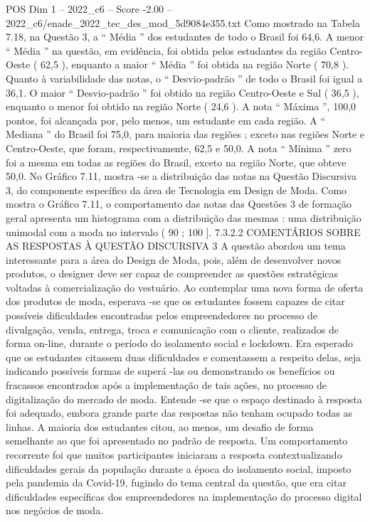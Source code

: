 \begin{textsample}{POS Dim 1 – 2022\_c6 – Score -2.00 – 2022\_c6/enade\_2022\_tec\_des\_mod\_5d9084e355.txt}
Como mostrado na Tabela 7.18, na Questão 3, a “ Média ” dos estudantes de todo o Brasil foi 64,6.
A menor “ Média ” na questão, em evidência, foi obtida pelos estudantes da região Centro-Oeste ( 62,5 ), enquanto a maior “ Média ” foi obtida na região Norte ( 70,8 ).
Quanto à variabilidade das notas, o “ Desvio-padrão ” de todo o Brasil foi igual a 36,1.
O maior “ Desvio-padrão ” foi obtido na região Centro-Oeste e Sul ( 36,5 ), enquanto o menor foi obtido na região Norte ( 24,6 ).
A nota “ Máxima ”, 100,0 pontos, foi alcançada por, pelo menos, um estudante em cada região.
A “ Mediana ” do Brasil foi 75,0, para maioria das regiões ; exceto nas regiões Norte e Centro-Oeste, que foram, respectivamente, 62,5 e 50,0.
A nota “ Mínima ” zero foi a mesma em todas as regiões do Brasil, exceto na região Norte, que obteve 50,0.
No Gráfico 7.11, mostra -se a distribuição das notas na Questão Discursiva 3, do componente específico da área de Tecnologia em Design de Moda.
Como mostra o Gráfico 7.11, o comportamento das notas das Questões 3 de formação geral apresenta um histograma com a distribuição das mesmas : uma distribuição unimodal com a moda no intervalo ( 90 ; 100 ]. 7.3.2.2 COMENTÁRIOS SOBRE AS RESPOSTAS À QUESTÃO DISCURSIVA 3 A questão abordou um tema interessante para a área do Design de Moda, pois, além de desenvolver novos produtos, o designer deve ser capaz de compreender as questões estratégicas voltadas à comercialização do vestuário.
Ao contemplar uma nova forma de oferta dos produtos de moda, esperava -se que os estudantes fossem capazes de citar possíveis dificuldades encontradas pelos empreendedores no processo de divulgação, venda, entrega, troca e comunicação com o cliente, realizados de forma on-line, durante o período do isolamento social e lockdown.
Era esperado que os estudantes citassem duas dificuldades e comentassem a respeito delas, seja indicando possíveis formas de superá -las ou demonstrando os benefícios ou fracassos encontrados após a implementação de tais ações, no processo de digitalização do mercado de moda.
Entende -se que o espaço destinado à resposta foi adequado, embora grande parte das respostas não tenham ocupado todas as linhas.
A maioria dos estudantes citou, ao menos, um desafio de forma semelhante ao que foi apresentado no padrão de resposta.
Um comportamento recorrente foi que muitos participantes iniciaram a resposta contextualizando dificuldades gerais da população durante a época do isolamento social, imposto pela pandemia da Covid-19, fugindo do tema central da questão, que era citar dificuldades específicas dos empreendedores na implementação do processo digital nos negócios de moda.

\end{textsample}
